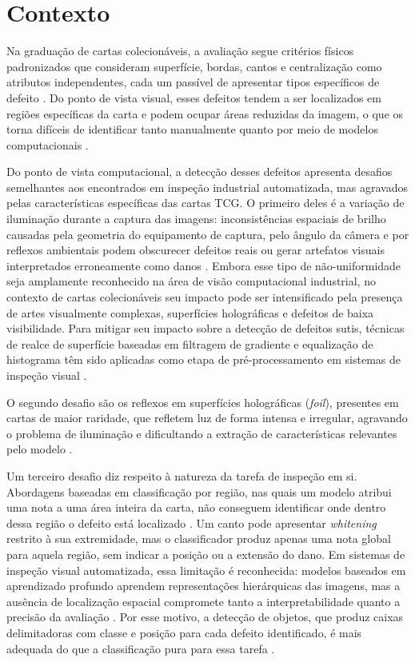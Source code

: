 \documentclass[
    12pt,                %
    openright,           %
    oneside,             %
    a4paper,             %
    english,             %
    brazil               %
]{abntex2}
\begin{document}
\section{Contexto}
\label{sec:contexto}

Na graduação de cartas colecionáveis, a avaliação segue critérios 
físicos padronizados que consideram superfície, bordas, cantos e 
centralização como atributos independentes, cada um passível de 
apresentar tipos específicos de defeito \cite{Nahar2025}. Do ponto de 
vista visual, esses defeitos tendem a ser localizados em regiões 
específicas da carta e podem ocupar áreas reduzidas da imagem, o que 
os torna difíceis de identificar tanto manualmente quanto por meio de 
modelos computacionais \cite{Nahar2025}.

Do ponto de vista computacional, a detecção desses defeitos apresenta desafios
semelhantes aos encontrados em inspeção industrial automatizada, mas agravados
pelas características específicas das cartas TCG. O primeiro deles é a variação
de iluminação durante a captura das imagens: inconsistências espaciais de brilho
causadas pela geometria do equipamento de captura, pelo ângulo da câmera e por
reflexos ambientais podem obscurecer defeitos reais ou gerar artefatos visuais
interpretados erroneamente como danos \cite{Zheng2021}. Embora esse tipo de
não-uniformidade seja amplamente reconhecido na área de visão computacional
industrial, no contexto de cartas colecionáveis seu impacto pode ser intensificado
pela presença de artes visualmente complexas, superfícies holográficas e defeitos
de baixa visibilidade. Para mitigar seu impacto sobre a detecção de defeitos sutis, 
técnicas de realce de superfície baseadas em filtragem de 
gradiente e equalização de histograma têm sido aplicadas como 
etapa de pré-processamento em sistemas de inspeção visual 
\cite{Chen2021, Sawada2024}.

O segundo desafio são os reflexos em superfícies holográficas 
(\textit{foil}), presentes em cartas de maior raridade, que refletem 
luz de forma intensa e irregular, agravando o problema de iluminação 
e dificultando a extração de características relevantes pelo modelo 
\cite{Nahar2025}.

Um terceiro desafio diz respeito à natureza da tarefa de inspeção em si. 
Abordagens baseadas em classificação por região, nas quais um modelo 
atribui uma nota a uma área inteira da carta, não conseguem identificar 
onde dentro dessa região o defeito está localizado \cite{Hussain2023}. 
Um canto pode apresentar \textit{whitening} restrito à sua extremidade, 
mas o classificador produz apenas uma nota global para aquela região, 
sem indicar a posição ou a extensão do dano. Em sistemas de inspeção 
visual automatizada, essa limitação é reconhecida: modelos baseados em 
aprendizado profundo aprendem representações hierárquicas das imagens, 
mas a ausência de localização espacial compromete tanto a 
interpretabilidade quanto a precisão da avaliação \cite{Zheng2021}. 
Por esse motivo, a detecção de objetos, que produz caixas delimitadoras 
com classe e posição para cada defeito identificado, é mais adequada do 
que a classificação pura para essa tarefa \cite{Ramos2025}.
\end{document}
